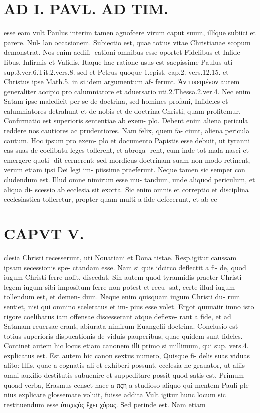 \documentclass{article}
\begin{document}
\begin{pages}
\section*{AD I. PAVL. AD TIM. }
\marginpar{[ p.300 ]}esse eam vult Paulus interim tamen agnofcere virum caput suum, illíque subiici et parere. Nul- lan occasionem. Subiectio est, quae totius vitae Christianae scopum demonstrat. Nos enim aedifi- cationi omnibus esse oportet Fidelibus et Infide Iibus. Infirmis et Validis. Itaque hac ratione usus est saepissime Paulus uti sup.3.ver.6.Tit.2.vers.8. sed et Petrus quoque 1.epist. cap.2. vers.12.15. et Christus ipse Math.5. in si.idem argumentum af- ferunt. Ἀν τικειμένον autem generaliter accipio pro calumniatore et aduersario uti.2.Thessa.2.ver.4. Nec enim Satam ipse maledicit per se de doctrina, sed homines profani, Infideles et calumniatores detrahunt et de nobis et de doctrina Christi, quam profitemur.   Confirmatio est superioris sententiae ab exem- plo. Debent enim aliena pericula reddere nos cautiores ac prudentiores. Nam felix, quem fa- ciunt, aliena pericula cautum. Hoc ipsum pro exem- plo et documento Papistis esse debuit, ut tyranni cas suas de coelibatu leges tollerent, et abroga- rent, cum inde tot mala nasci et emergere quoti- dit cernerent: sed mordicus doctrinam suam non modo retinent, verum etiam ipsi Dei legi im- piissime praeferunt. Neque tamen sic semper con cludendum est. Illud omne nimirum esse mu- tandum, unde aliquod periculum, et aliqua di- scessio ab ecclesia sit exorta. Sic enim omnis et correptio et disciplina ecclesiastica tolleretur, propter quam multi a fide defecerunt, et ab ec- 
\section*{CAPVT  V. }
\marginpar{[ p.301 ]}clesia Christi recesserunt, uti Nouatiani et Dona tistae. Resp.igitur caussam ipsam secessionis spe- ctandam esse. Nam si quis idcirco deflectit a fi- de, quod iugum Christi ferre nolit, discedat. Sin autem quod tyrannidis praeter Christi legem iugum sibi impositum ferre non potest et recu- sat, certe illud iugum tollendum est, et demen- dum. Neque enim quisquam iugum Christi du- rum sentiet, nisi qui omnino sceleratus et im- pius esse volet. Ergot quuuaiir imno isto rigore coelibatus iam offensae discesserant atque deflexe- rant a fide, et ad Satanam reuersae erant, abiurata nimirum Euangelii doctrina.     Conclusio est totius superioris dispucationis de viduis pauperibus, quae quidem sunt fideles. Continet autem hic locus etiam canonem illi primo si millimum, qui sup. vers.4. explicatus est. Est autem hic canon sextus numero, Quisque fi- delis suas viduas alito: Illis, quae a cognatis ali et exhiberi possunt, ecclesia ne grauator, ut aliis omni auxilio destitutis subuenire et suppeditare possit quod satis est. Primum quoad verba, Erasmus censet haec a πςὴ a studioso aliquo qui mentem Pauli ple- nius explicare glossemate voluit, fuisse addita Vult igitur hunc locum sic restituendum esse ὐτιςπςὸς ἔχει χόρας. Sed perinde est. Nam etiam 

\end{pages}
\end{document}
